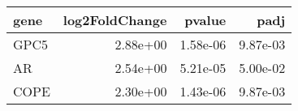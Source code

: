 \begin{tabular}{lrrr}
\toprule
gene &  log2FoldChange &   pvalue &     padj \\
\midrule
GPC5 &        2.88e+00 & 1.58e-06 & 9.87e-03 \\
  AR &        2.54e+00 & 5.21e-05 & 5.00e-02 \\
COPE &        2.30e+00 & 1.43e-06 & 9.87e-03 \\
\bottomrule
\end{tabular}
